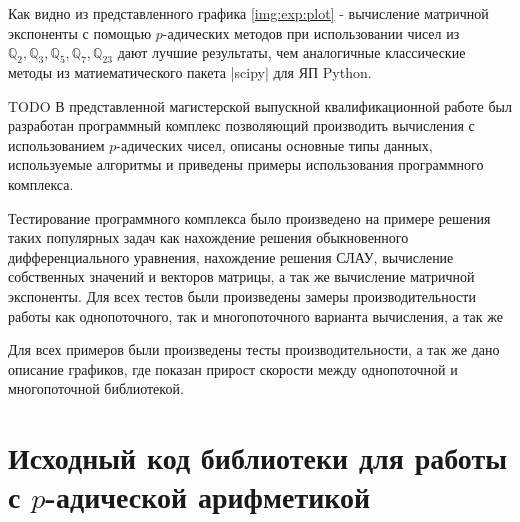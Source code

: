 \documentclass[master, och, diploma, times]{sty/SCWorks}
\theoremstyle{plain}
\theoremstyle{definition}
\numberwithin{equation}{section}
\begin{document}
Как видно из представленного графика \ref{img:exp:plot} - вычисление матричной экспоненты с помощью $p$-адических методов при использовании чисел из $\mathbb{Q}_2, \mathbb{Q}_3, \mathbb{Q}_5, \mathbb{Q}_7, \mathbb{Q}_{23}$ дают лучшие результаты, чем аналогичные классические методы из матиематического пакета |scipy| для ЯП Python.


\conclusion
TODO
В представленной магистерской выпускной квалификационной работе был разработан программный комплекс позволяющий производить вычисления с использованием $p$-адических чисел, описаны основные типы данных, используемые алгоритмы и приведены примеры использования программного комплекса.

Тестирование программного комплекса было произведено на примере решения таких популярных задач как нахождение решения обыкновенного дифференциального уравнения, нахождение решения СЛАУ, вычисление собственных значений и векторов матрицы, а так же вычисление матричной экспоненты. Для всех тестов были произведены замеры производительности работы как однопоточного, так и многопоточного варианта вычисления, а так же 


Для всех примеров были произведены тесты производительности, а так же дано описание графиков, где показан прирост скорости между однопоточной и многопоточной библиотекой.






\appendix

\section{Исходный код библиотеки для работы с $p$-адической арифметикой}


%
%
%
%
%
%
%
%
\end{document}
